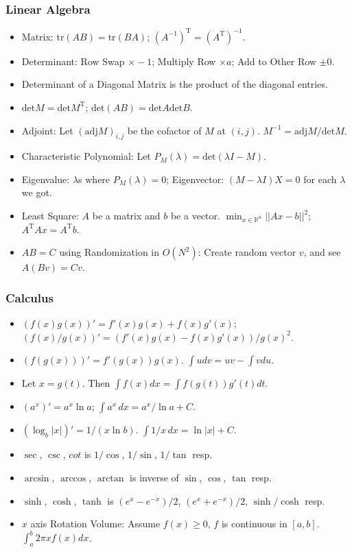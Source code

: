 \subsubsection*{Linear Algebra}
\begin{itemize}
	\item Matrix: $\mathrm{tr}(AB) = \mathrm{tr}(BA)$; $(A^{-1})^{\mathrm{T}} = (A^{\mathrm{T}})^{-1}$.
	\item Determinant: Row Swap $\times -1$; Multiply Row $\times a$; Add to Other Row $\pm 0$.
	\item Determinant of a Diagonal Matrix is the product of the diagonal entries.
	\item $\mathrm{det} M = \mathrm{det} M^{\mathrm{T}}$; $\mathrm{det}(AB) = \mathrm{det} A \mathrm{det} B$.
	\item Adjoint: Let $(\mathrm{adj} M)_{i, j}$ be the cofactor of $M$ at $(i, j)$. $M^{-1} = \mathrm{adj} M / \mathrm{det} M$.
	\item Characteristic Polynomial: Let $P_M(\lambda) = \mathrm{det}(\lambda I - M)$.
	\item Eigenvalue: $\lambda$s where $P_M(\lambda) = 0$; Eigenvector: $(M - \lambda I) X = 0$ for each $\lambda$ we got.
	\item Least Square: $A$ be a matrix and $b$ be a vector. $\min_{x \in \mathbb{R}^n} ||Ax - b||^2$; $A^{\mathrm{T}} A x = A^{\mathrm{T}} b$.
	\item $AB = C$ using Randomization in $O(N^2)$: Create random vector $v$, and see $A(Bv) = Cv$.
\end{itemize}

\subsubsection*{Calculus}
\begin{itemize}
	\item $(f(x) g(x))' = f'(x) g(x) + f(x) g'(x)$; $(f(x)/g(x))' = (f'(x) g(x) - f(x) g'(x)) / g(x)^2$.
	\item $(f(g(x)))' = f'(g(x)) g(x)$. $\int u dv = uv - \int v du$.
	\item Let $x = g(t)$. Then $\int f(x) dx = \int f(g(t)) g'(t) dt$.
	\item $(a^x)' = a^x \ln a$; $\int a^x \,dx= a^x / \ln a + C$.
	\item $(\log_b |x|)' = 1/(x \ln b)$. $\int 1/x \,dx = \ln |x| + C$.
	\item $\sec$, $\csc$, $cot$ is $1/\cos$, $1/\sin$, $1/\tan$ resp.
	\item $\arcsin$, $\arccos$, $\arctan$ is inverse of $\sin$, $\cos$, $\tan$ resp.
	\item $\sinh$, $\cosh$, $\tanh$ is $(e^x - e^{-x})/2$, $(e^x + e^{-x})/2$, $\sinh/\cosh$ resp.
	\item $x$ axis Rotation Volume: Assume $f(x) \ge 0$, $f$ is continuous in $[a, b]$. $\int_{a}^{b} 2 \pi x f(x) dx$.
\end{itemize}

